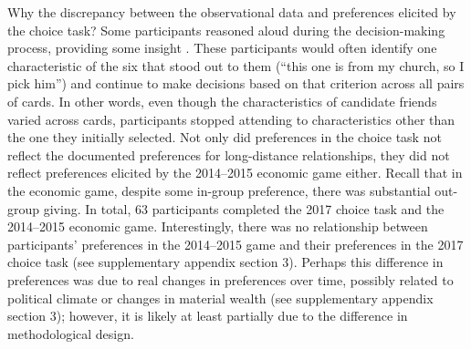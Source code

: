 \documentclass[bibauthoryear]{aa}
\begin{document}
	Why the discrepancy between the observational data and preferences elicited by the choice task? Some participants reasoned aloud during the decision-making process, providing some insight \citep{bernard2017research}. These participants would often identify one characteristic of the six that stood out to them (``this one is from my church, so I pick him'') and continue to make decisions based on that criterion across all pairs of cards. In other words, even though the characteristics of candidate friends varied across cards, participants stopped attending to characteristics other than the one they initially  selected. Not only did preferences in the choice task not reflect the documented preferences for long-distance relationships,  they did not reflect preferences elicited by the 2014--2015 economic game either. Recall that in the economic game, despite some in-group preference, there was substantial out-group giving. In total, 63 participants completed the 2017 choice task and the 2014--2015 economic game. Interestingly, there was no relationship between participants' preferences in the 2014--2015 game and their preferences in the 2017 choice task (see supplementary appendix section 3). Perhaps this difference in preferences was due to real changes in preferences over time, possibly related to political climate or changes in material wealth (see supplementary appendix section 3); however, it is likely at least partially due to the difference in methodological design.
	
	
\end{document}
